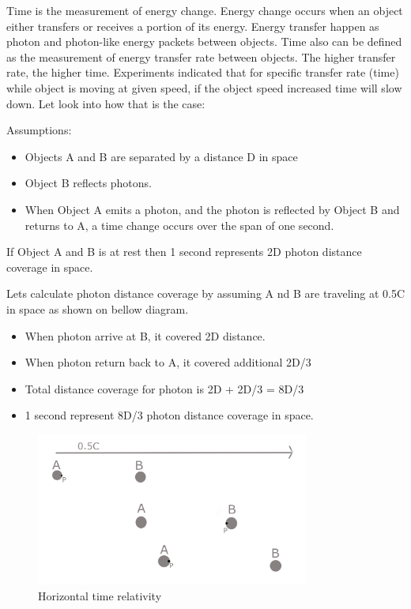 \documentclass{article}
\begin{document}
    Time is the measurement of energy change.
    Energy change occurs when an object either transfers or receives a portion of its energy.
    Energy transfer happen as photon and photon-like energy packets between objects.
    Time also can be defined as the measurement of energy transfer rate between objects.
    The higher transfer rate, the higher time.
    Experiments\cite{bailey1977} indicated that for specific transfer rate (time) while object is moving at given speed, if the object speed increased time will slow down.
    Let look into how that is the case:

    Assumptions:
    \begin{itemize}
        \item Objects A and B are separated by a distance D in space
        \item Object B reflects photons.
        \item When Object A emits a photon, and the photon is reflected by Object B and returns to A, a time change occurs over the span of one second.
    \end{itemize}

    If Object A and B is at rest then 1 second represents 2D photon distance coverage in space.

    Lets calculate photon distance coverage by assuming A nd B are traveling at 0.5C in space as shown on bellow diagram.

    \begin{itemize}
        \item When photon arrive at B, it covered 2D distance.
        \item When photon return back to A, it covered additional 2D/3
        \item Total distance coverage for photon is 2D + 2D/3 = 8D/3
        \item 1 second represent 8D/3 photon distance coverage in space.
    \end{itemize}

    \begin{figure}[H]
        \centering
        \includegraphics[width=0.8\textwidth]{images/horizontal-time-relativity}
        \caption{Horizontal time relativity}
        \label{fig:time relativity}
    \end{figure}
\end{document}
